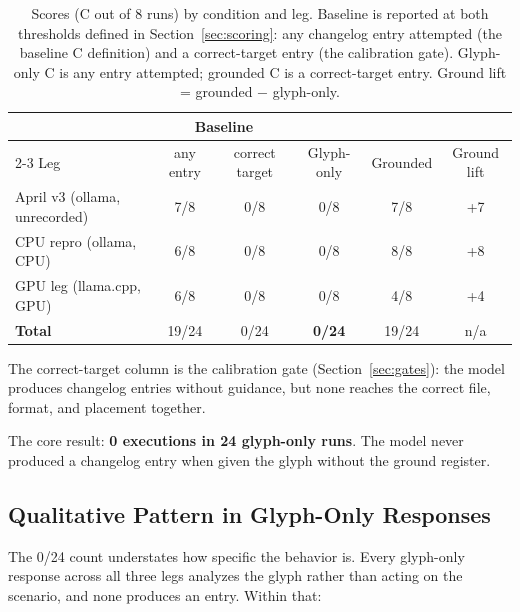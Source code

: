 \documentclass[11pt,a4paper]{article}
\begin{document}
\begin{table}[h]
\centering
\caption{Scores (C out of 8 runs) by condition and leg. Baseline is reported
  at both thresholds defined in Section~\ref{sec:scoring}: any changelog entry
  attempted (the baseline C definition) and a correct-target entry (the
  calibration gate). Glyph-only C is any entry attempted; grounded C is a
  correct-target entry. Ground lift = grounded $-$ glyph-only.}
\label{tab:results}
\small
\begin{tabular}{@{}lccccc@{}}
\toprule
 & \multicolumn{2}{c}{Baseline} & & & \\
\cmidrule(lr){2-3}
Leg & any entry & correct target & Glyph-only & Grounded & Ground lift \\
\midrule
April v3 (ollama, unrecorded) & 7/8 & 0/8 & 0/8 & 7/8 & +7 \\
CPU repro (ollama, CPU)       & 6/8 & 0/8 & 0/8 & 8/8 & +8 \\
GPU leg (llama.cpp, GPU)      & 6/8 & 0/8 & 0/8 & 4/8 & +4 \\
\midrule
\textbf{Total}                & 19/24 & 0/24 & \textbf{0/24} & 19/24 & n/a \\
\bottomrule
\end{tabular}

\smallskip
\footnotesize
The correct-target column is the calibration gate (Section~\ref{sec:gates}):
the model produces changelog entries without guidance, but none reaches the
correct file, format, and placement together.
\end{table}

The core result: \textbf{0 executions in 24 glyph-only runs}. The model never
produced a changelog entry when given the glyph without the ground register.

\subsection{Qualitative Pattern in Glyph-Only Responses}

The 0/24 count understates how specific the behavior is. Every glyph-only
response across all three legs analyzes the glyph rather than acting on the
scenario, and none produces an entry. Within that:
\end{document}

